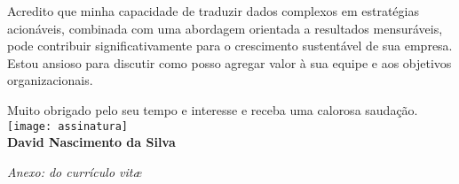 \vspace{1.5em} %
Acredito que minha capacidade de traduzir dados complexos em estratégias acionáveis, combinada com uma abordagem orientada a resultados mensuráveis, pode contribuir significativamente para o crescimento sustentável de sua empresa. Estou ansioso para discutir como posso agregar valor à sua equipe e aos objetivos organizacionais.

\raggedleft%
Muito obrigado pelo seu tempo e interesse e receba uma calorosa saudação.\\[0.1em]
\texttt{[image: assinatura]}\\[-0.1em]
{\bfseries David Nascimento da Silva}~~~~~~~~~~~\vspace*{-0.5em}
%
\vfill%
\raggedright%
{\slshape Anexo: do currículo vit\ae{}}%

